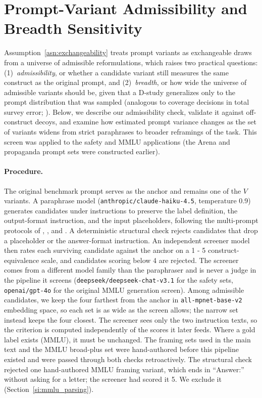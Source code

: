 \clearpage

\section{Prompt-Variant Admissibility and Breadth Sensitivity}
\label{si:prompt_admissibility}

Assumption~\ref{asn:exchangeability} treats prompt variants as exchangeable draws from a universe of admissible reformulations, which raises two practical questions: (1)~\emph{admissibility}, or whether a candidate variant still measures the same construct as the original prompt, and (2)~\emph{breadth}, or how wide the universe of admissible variants should be, given that a D-study generalizes only to the prompt distribution that was sampled \citep{cronbach1972dependability, brennan2001gtheory} (analogous to coverage decisions in total survey error; \citealt{groves2010survey}). Below, we describe our admissibility check, validate it against off-construct decoys, and examine how estimated prompt variance changes as the set of variants widens from strict paraphrases to broader reframings of the task. This screen was applied to the safety and MMLU applications (the Arena and propaganda prompt sets were constructed earlier).

\paragraph{Procedure.} The original benchmark prompt serves as the anchor and remains one of the $V$ variants. A paraphrase model (\texttt{anthropic/claude-haiku-4.5}, temperature 0.9) generates candidates under instructions to preserve the label definition, the output-format instruction, and the input placeholders, following the multi-prompt protocols of \citet{mizrahi2024multiprompt}, \citet{sclar2024sensitivity}, and \citet{barrie2024pss}. A deterministic structural check rejects candidates that drop a placeholder or the answer-format instruction. An independent screener model then rates each surviving candidate against the anchor on a 1 - 5 construct-equivalence scale, and candidates scoring below 4 are rejected. The screener comes from a different model family than the paraphraser and is never a judge in the pipeline it screens (\texttt{deepseek/deepseek-chat-v3.1} for the safety sets, \texttt{openai/gpt-4o} for the original MMLU generation screen). Among admissible candidates, we keep the four farthest from the anchor in \texttt{all-mpnet-base-v2} embedding space, so each set is as wide as the screen allows; the narrow set instead keeps the four closest. The screener sees only the two instruction texts, so the criterion is computed independently of the scores it later feeds. Where a gold label exists (MMLU), it must be unchanged. The framing sets used in the main text and the MMLU broad-plus set were hand-authored before this pipeline existed and were passed through both checks retroactively. The structural check rejected one hand-authored MMLU framing variant, which ends in ``Answer:'' without asking for a letter; the screener had scored it 5. We exclude it (Section~\ref{si:mmlu_parsing}).

